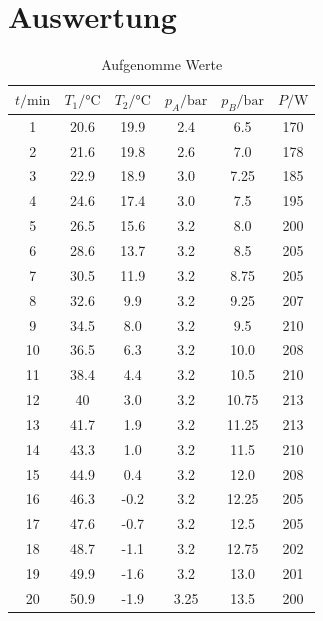 \section{Auswertung}
\label{sec:Auswertung}

\begin{table}
  \centering
  \caption{Aufgenomme Werte }
  \label{tab:werte}
  \begin{tabular}{S S S S S S}
    \toprule
    {$t/\si{\minute}$} & {$T_1/\si{\celsius}$} & {$T_2/\si{\celsius}$} & {$p_A/\si{\bar}$} & {$p_B/\si{\bar}$} & {$P/\si{\watt}$} \\
             & 20.6 & 19.9 & 2.4  & 6.5   &  170\\
    2         & 21.6 & 19.8 & 2.6  & 7.0     &  178\\
    3         & 22.9 & 18.9 & 3.0    & 7.25  &  185\\
    4         & 24.6 & 17.4 & 3.0    & 7.5    & 195\\
    5         & 26.5 & 15.6 & 3.2  & 8.0     &  200\\
    6         & 28.6 & 13.7 & 3.2  & 8.5     &205\\
    7         & 30.5 & 11.9 & 3.2  & 8.75   & 205\\
    8         & 32.6  &9.9  & 3.2  & 9.25   & 207\\
    9         & 34.5 & 8.0  & 3.2  & 9.5    & 210\\
    10        & 36.5 & 6.3  & 3.2  & 10.0     & 208\\
    11        & 38.4 & 4.4  & 3.2  & 10.5   & 210\\
    12        & 40   & 3.0  & 3.2  & 10.75  & 213\\
    13        & 41.7 & 1.9   &3.2  & 11.25  & 213\\
    14        & 43.3 & 1.0  & 3.2  & 11.5   & 210\\
    15        & 44.9 & 0.4  & 3.2  & 12.0     & 208\\
    16        & 46.3 & -0.2 & 3.2  & 12.25  & 205\\
    17        & 47.6 & -0.7 & 3.2  & 12.5   & 205\\
    18        & 48.7 & -1.1 & 3.2  & 12.75  & 202\\
    19        & 49.9 & -1.6 & 3.2  & 13.0     & 201\\
    20        & 50.9 & -1.9 & 3.25 & 13.5   & 200\\
    \bottomrule
  \end{tabular}
\end{table}

